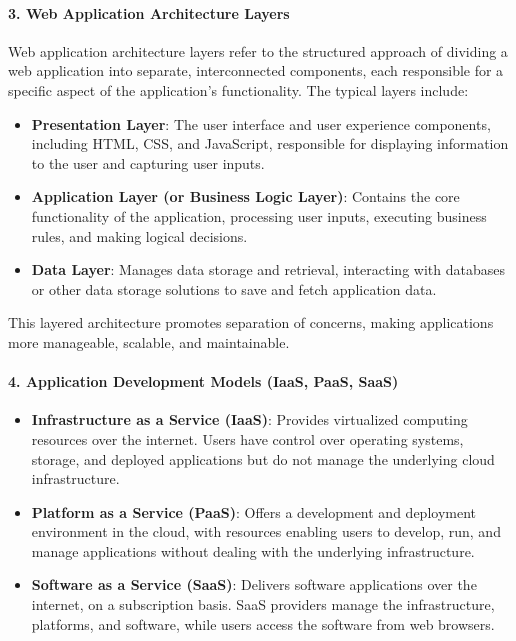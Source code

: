 \documentclass[10pt, landscape]{article}
\begin{document}
\begin{multicols*}{4}
\paragraph{3. Web Application Architecture
Layers}\label{web-application-architecture-layers}

Web application architecture layers refer to the structured approach of
dividing a web application into separate, interconnected components,
each responsible for a specific aspect of the application's
functionality. The typical layers include:

\begin{itemize}
\tightlist
\item
  \textbf{Presentation Layer}: The user interface and user experience
  components, including HTML, CSS, and JavaScript, responsible for
  displaying information to the user and capturing user inputs.
\item
  \textbf{Application Layer (or Business Logic Layer)}: Contains the
  core functionality of the application, processing user inputs,
  executing business rules, and making logical decisions.
\item
  \textbf{Data Layer}: Manages data storage and retrieval, interacting
  with databases or other data storage solutions to save and fetch
  application data.
\end{itemize}

This layered architecture promotes separation of concerns, making
applications more manageable, scalable, and maintainable.

\paragraph{4. Application Development Models (IaaS, PaaS,
SaaS)}\label{application-development-models-iaas-paas-saas}

\begin{itemize}
\tightlist
\item
  \textbf{Infrastructure as a Service (IaaS)}: Provides virtualized
  computing resources over the internet. Users have control over
  operating systems, storage, and deployed applications but do not
  manage the underlying cloud infrastructure.
\item
  \textbf{Platform as a Service (PaaS)}: Offers a development and
  deployment environment in the cloud, with resources enabling users to
  develop, run, and manage applications without dealing with the
  underlying infrastructure.
\item
  \textbf{Software as a Service (SaaS)}: Delivers software applications
  over the internet, on a subscription basis. SaaS providers manage the
  infrastructure, platforms, and software, while users access the
  software from web browsers.
\end{itemize}


\end{multicols*}
\end{document}
